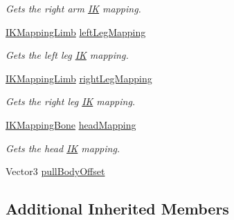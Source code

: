 \begin{DoxyCompactItemize}
\begin{DoxyCompactList}\small\item\em Gets the right arm \mbox{\hyperlink{class_root_motion_1_1_final_i_k_1_1_i_k}{IK}} mapping. \end{DoxyCompactList}\item 
\mbox{\hyperlink{class_root_motion_1_1_final_i_k_1_1_i_k_mapping_limb}{I\+K\+Mapping\+Limb}} \mbox{\hyperlink{class_root_motion_1_1_final_i_k_1_1_i_k_solver_full_body_biped_ab03f847a30c8ad506325353756e809c6}{left\+Leg\+Mapping}}
\begin{DoxyCompactList}\small\item\em Gets the left leg \mbox{\hyperlink{class_root_motion_1_1_final_i_k_1_1_i_k}{IK}} mapping. \end{DoxyCompactList}\item 
\mbox{\hyperlink{class_root_motion_1_1_final_i_k_1_1_i_k_mapping_limb}{I\+K\+Mapping\+Limb}} \mbox{\hyperlink{class_root_motion_1_1_final_i_k_1_1_i_k_solver_full_body_biped_ae29edf9bcd4204a5431a483198e065c3}{right\+Leg\+Mapping}}
\begin{DoxyCompactList}\small\item\em Gets the right leg \mbox{\hyperlink{class_root_motion_1_1_final_i_k_1_1_i_k}{IK}} mapping. \end{DoxyCompactList}\item 
\mbox{\hyperlink{class_root_motion_1_1_final_i_k_1_1_i_k_mapping_bone}{I\+K\+Mapping\+Bone}} \mbox{\hyperlink{class_root_motion_1_1_final_i_k_1_1_i_k_solver_full_body_biped_ac22e05e856e1300e572e2596c7adec95}{head\+Mapping}}
\begin{DoxyCompactList}\small\item\em Gets the head \mbox{\hyperlink{class_root_motion_1_1_final_i_k_1_1_i_k}{IK}} mapping. \end{DoxyCompactList}\item 
Vector3 \mbox{\hyperlink{class_root_motion_1_1_final_i_k_1_1_i_k_solver_full_body_biped_a8f89027d56337408f1de36867867f58e}{pull\+Body\+Offset}}
\end{DoxyCompactItemize}
\subsection*{Additional Inherited Members}


